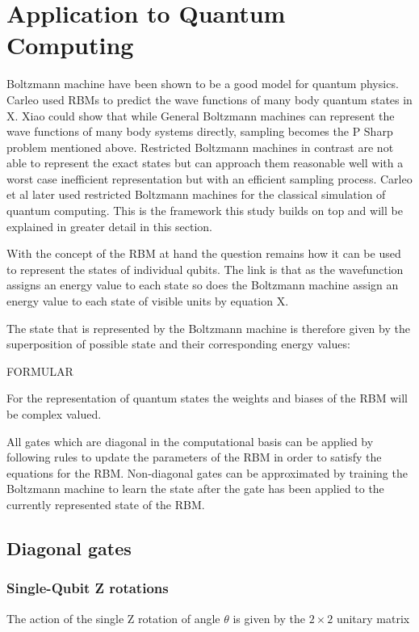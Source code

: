 \section{Application to Quantum Computing}
\label{sec:applicationToQuantumComputing}
Boltzmann machine have been shown to be a good model for quantum physics. Carleo used RBMs to predict the wave functions 
of many body quantum states in X. Xiao could show that while General Boltzmann machines can represent the wave functions of 
many body systems directly, sampling becomes the P Sharp problem mentioned above. Restricted Boltzmann machines in contrast 
are not able to represent the exact states but can approach them reasonable well with a worst case inefficient representation 
but with an efficient sampling process. Carleo et al later used restricted Boltzmann machines for the classical simulation of 
quantum computing. This is the framework this study builds on top and will be explained in greater detail in this section.

With the concept of the RBM at hand the question remains how it can be used to represent the states of individual qubits. The
link is that as the wavefunction assigns an energy value to each state so does the Boltzmann machine assign an energy value 
to each state of visible units by equation X.

The state that is represented by the Boltzmann machine is therefore given by the superposition of possible state and their 
corresponding energy values:

FORMULAR

For the representation of quantum states the weights and biases of the RBM will be complex valued.

All gates which are diagonal in the computational basis can be applied by following rules to update the parameters of the RBM
in order to satisfy the equations for the RBM. Non-diagonal gates can be approximated by training the Boltzmann machine to 
learn the state after the gate has been applied to the currently represented state of the RBM.

\subsection{Diagonal gates}
\subsubsection{Single-Qubit Z rotations}
The action of the single Z rotation of angle $\theta$ is given by the $2\times2$ unitary matrix

